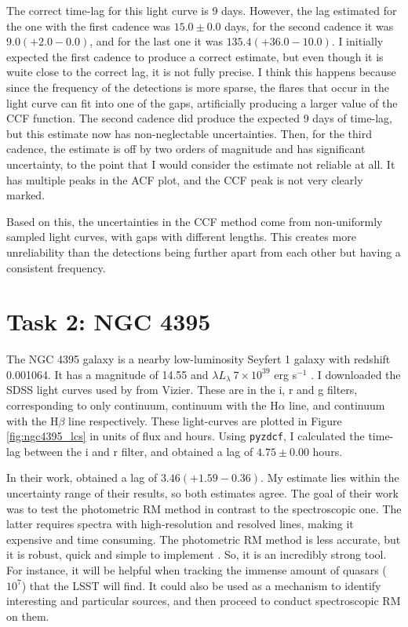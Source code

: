 \documentclass[letterpaper, oneside]{article}
\begin{document}
The correct time-lag for this light curve is 9 days. However, the lag estimated for the one with the first cadence was $15.0 \pm 0.0$ days, for the second cadence it was $9.0 (+ 2.0 - 0.0)$, and for the last one it was $135.4 (+ 36.0 - 10.0)$. I initially expected the first cadence to produce a correct estimate, but even though it is wuite close to the correct lag, it is not fully precise. I think this happens because since the frequency of the detections is more sparse, the flares that occur in the light curve can fit into one of the gaps, artificially producing a larger value of the CCF function. The second cadence did produce the expected 9 days of time-lag, but this estimate now has non-neglectable uncertainties. Then, for the third cadence, the estimate is off by two orders of magnitude and has significant uncertainty, to the point that I would consider the estimate not reliable at all. It has multiple peaks in the ACF plot, and the CCF peak is not very clearly marked.

Based on this, the uncertainties in the CCF method come from non-uniformly sampled light curves, with gaps with different lengths. This creates more unreliability than the detections being further apart from each other but having a consistent frequency.


\section*{Task 2: NGC 4395}

The NGC 4395 galaxy \cite{simbad_ngc4395} is a nearby low-luminosity Seyfert 1 galaxy with redshift 0.001064. It has a magnitude of 14.55 and $\lambda L_{\lambda} ~ 7 \times 10^{39}$ erg s$^{-1}$ \cite{Abazajian_2009, Edri_2012}. I downloaded the SDSS light curves used by \cite{Edri_2012} from Vizier. These are in the i, r and g filters, corresponding to only continuum, continuum with the H$\alpha$ line, and continuum with the H$\beta$ line respectively. These light-curves are plotted in Figure \ref{fig:ngc4395_lcs} in units of flux and hours. Using \texttt{pyzdcf}, I calculated the time-lag between the i and r filter, and obtained a lag of $4.75 \pm 0.00$ hours.

In their work, \cite{Edri_2012} obtained a lag of $3.46 (+1.59-0.36)$. My estimate lies within the uncertainty range of their results, so both estimates agree. The goal of their work was to test the photometric RM method in contrast to the spectroscopic one. The latter requires spectra with high-resolution and resolved lines, making it expensive and time consuming. The photometric RM method is less accurate, but it is robust, quick and simple to implement \cite{Chelouche_Daniel_2012}. So, it is an incredibly strong tool. For instance, it will be helpful when tracking the immense amount of quasars ($10^7$) that the LSST will find. It could also be used as a mechanism to identify interesting and particular sources, and then proceed to conduct spectroscopic RM on them.
\end{document}

